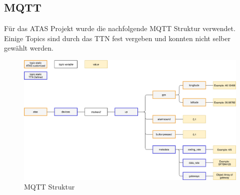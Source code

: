 \documentclass[11pt,english,german]{report}
\theoremstyle{definition}
\begin{document}
\subsection{MQTT}
Für das ATAS Projekt wurde die nachfolgende MQTT Struktur verwendet. Einige Topics sind durch das TTN fest vergeben und konnten nicht selber gewählt werden.
\begin{figure}[H]
	\centering
	\includegraphics[width=\textwidth]{img/ATAS_MQTT_Topic_BA.png}
	\caption[MQTT Struktur]
	{MQTT Struktur}
\end{figure}

\newpage
\end{document}
